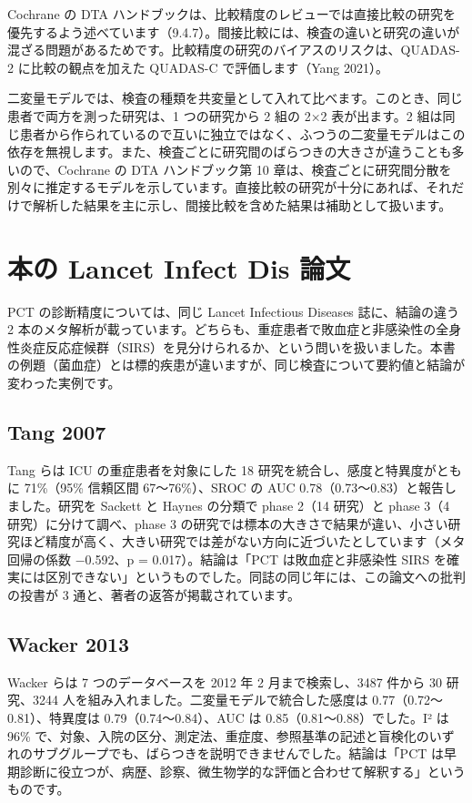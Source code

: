 Cochrane の DTA ハンドブックは、比較精度のレビューでは直接比較の研究を優先するよう述べています（9.4.7）。間接比較には、検査の違いと研究の違いが混ざる問題があるためです。比較精度の研究のバイアスのリスクは、QUADAS-2 に比較の観点を加えた QUADAS-C で評価します（Yang 2021）。

二変量モデルでは、検査の種類を共変量として入れて比べます。このとき、同じ患者で両方を測った研究は、1 つの研究から 2 組の 2×2 表が出ます。2 組は同じ患者から作られているので互いに独立ではなく、ふつうの二変量モデルはこの依存を無視します。また、検査ごとに研究間のばらつきの大きさが違うことも多いので、Cochrane の DTA ハンドブック第 10 章は、検査ごとに研究間分散を別々に推定するモデルを示しています。直接比較の研究が十分にあれば、それだけで解析した結果を主に示し、間接比較を含めた結果は補助として扱います。

\section{ 本の Lancet Infect Dis 論文}
\label{sec:14-7}

PCT の診断精度については、同じ Lancet Infectious Diseases 誌に、結論の違う 2 本のメタ解析が載っています。どちらも、重症患者で敗血症と非感染性の全身性炎症反応症候群（SIRS）を見分けられるか、という問いを扱いました。本書の例題（菌血症）とは標的疾患が違いますが、同じ検査について要約値と結論が変わった実例です。

\subsection{\hatten Tang 2007}
\label{sec:14-7-1}

Tang らは ICU の重症患者を対象にした 18 研究を統合し、感度と特異度がともに 71\%（95\% 信頼区間 67〜76\%）、SROC の AUC 0.78（0.73〜0.83）と報告しました。研究を Sackett と Haynes の分類で phase 2（14 研究）と phase 3（4 研究）に分けて調べ、phase 3 の研究では標本の大きさで結果が違い、小さい研究ほど精度が高く、大きい研究では差がない方向に近づいたとしています（メタ回帰の係数 −0.592、p = 0.017）。結論は「PCT は敗血症と非感染性 SIRS を確実には区別できない」というものでした。同誌の同じ年には、この論文への批判の投書が 3 通と、著者の返答が掲載されています。

\subsection{\hatten Wacker 2013}
\label{sec:14-7-2}

Wacker らは 7 つのデータベースを 2012 年 2 月まで検索し、3487 件から 30 研究、3244 人を組み入れました。二変量モデルで統合した感度は 0.77（0.72〜0.81）、特異度は 0.79（0.74〜0.84）、AUC は 0.85（0.81〜0.88）でした。I² は 96\% で、対象、入院の区分、測定法、重症度、参照基準の記述と盲検化のいずれのサブグループでも、ばらつきを説明できませんでした。結論は「PCT は早期診断に役立つが、病歴、診察、微生物学的な評価と合わせて解釈する」というものです。

